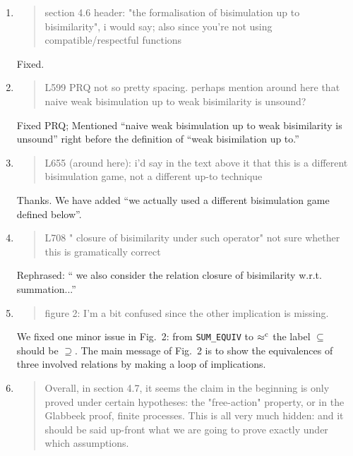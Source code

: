 \begin{enumerate}
\item \begin{quote}
    section 4.6 header: "the formalisation of bisimulation up to
    bisimilarity", i would say; also since you're not using
    compatible/respectful functions
  \end{quote}
  Fixed.
  
\item \begin{quote}
    L599 PRQ not so pretty spacing. perhaps mention around here that
    naive weak bisimulation up to weak bisimilarity is unsound?
  \end{quote}
  Fixed PRQ; Mentioned ``naive weak bisimulation up to weak
  bisimilarity is unsound'' right before the definition of ``weak
  bisimilation up to.''
  
\item \begin{quote}
    L655 (around here): i'd say in the text above it that this is a
    different bisimulation game, not a different up-to technique
  \end{quote}
  Thanks. We have added ``we actually used a different bisimulation game defined below''.

\item \begin{quote}
    L708 " closure of bisimilarity under such operator" not sure whether this is gramatically correct
  \end{quote}
  Rephrased: `` we also consider the relation closure of bisimilarity
  w.r.t. summation...''

\item \begin{quote}
    figure 2: I'm a bit confused since the other implication is missing. 
  \end{quote}
  We fixed one minor issue in Fig.~2: from \texttt{SUM_EQUIV} to
  $\mathrel{\approx^{\rm{c}}}$ the label $\subseteq$ should be $\supseteq$. The main
  message of Fig.~2 is to show the equivalences of three involved
  relations by making a loop of implications.
  
\item \begin{quote}
    Overall, in section 4.7, it seems the claim in the beginning is
    only proved under certain hypotheses: the "free-action" property,
    or in the Glabbeek proof, finite processes. This is all very much
    hidden: and it should be said up-front what we are going to prove
    exactly under which assumptions.
  \end{quote}


\end{enumerate}
